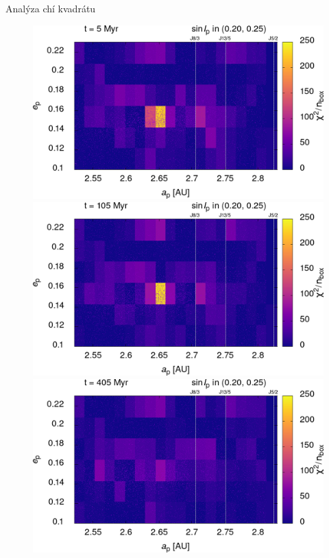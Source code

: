 \documentclass[xcolor=dvipsnames]{beamer}
\begin{document}
\begin{frame}[t]{\secname}{Analýza chí kvadrátu}
	\centering
	\begin{figure}
		\includegraphics[width=0.41\paperwidth]{../obr/ae_chi_0006t.png}
		\includegraphics[width=0.41\paperwidth]{../obr/ae_chi_0106t.png}\\
		\includegraphics[width=0.41\paperwidth]{../obr/ae_chi_0406t.png}

\end{figure}
\end{frame}
\end{document}
